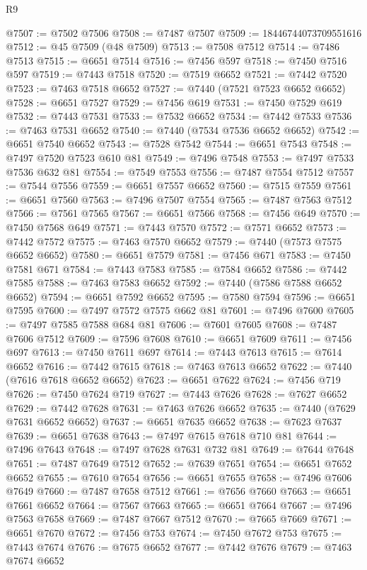 \begin{lexlean}{R9}
\begin{coremodule}
{{{{{{{{{{{{{{{{{{{{{{{{{{{{{{{{{{{{{{{{{{{{{{{{{{{{{{{{{{{{{{{{{{{{{{{{{{{{{{{{{{{{@7507 := @7502 @7506
@7508 := @7487 @7507
@7509 := 18446744073709551616
@7512 := @45 @7509 (@48 @7509)
@7513 := @7508 @7512
@7514 := @7486 @7513
@7515 := @6651 @7514
@7516 := @7456 @597
@7518 := @7450 @7516 @597
@7519 := @7443 @7518
@7520 := @7519 @6652
@7521 := @7442 @7520
@7523 := @7463 @7518 @6652
@7527 := @7440 (@7521 @7523 @6652 @6652)
@7528 := @6651 @7527
@7529 := @7456 @619
@7531 := @7450 @7529 @619
@7532 := @7443 @7531
@7533 := @7532 @6652
@7534 := @7442 @7533
@7536 := @7463 @7531 @6652
@7540 := @7440 (@7534 @7536 @6652 @6652)
@7542 := @6651 @7540 @6652
@7543 := @7528 @7542
@7544 := @6651 @7543
@7548 := @7497 @7520 @7523 @610 @81
@7549 := @7496 @7548
@7553 := @7497 @7533 @7536 @632 @81
@7554 := @7549 @7553
@7556 := @7487 @7554 @7512
@7557 := @7544 @7556
@7559 := @6651 @7557 @6652
@7560 := @7515 @7559
@7561 := @6651 @7560
@7563 := @7496 @7507 @7554
@7565 := @7487 @7563 @7512
@7566 := @7561 @7565
@7567 := @6651 @7566
@7568 := @7456 @649
@7570 := @7450 @7568 @649
@7571 := @7443 @7570
@7572 := @7571 @6652
@7573 := @7442 @7572
@7575 := @7463 @7570 @6652
@7579 := @7440 (@7573 @7575 @6652 @6652)
@7580 := @6651 @7579
@7581 := @7456 @671
@7583 := @7450 @7581 @671
@7584 := @7443 @7583
@7585 := @7584 @6652
@7586 := @7442 @7585
@7588 := @7463 @7583 @6652
@7592 := @7440 (@7586 @7588 @6652 @6652)
@7594 := @6651 @7592 @6652
@7595 := @7580 @7594
@7596 := @6651 @7595
@7600 := @7497 @7572 @7575 @662 @81
@7601 := @7496 @7600
@7605 := @7497 @7585 @7588 @684 @81
@7606 := @7601 @7605
@7608 := @7487 @7606 @7512
@7609 := @7596 @7608
@7610 := @6651 @7609
@7611 := @7456 @697
@7613 := @7450 @7611 @697
@7614 := @7443 @7613
@7615 := @7614 @6652
@7616 := @7442 @7615
@7618 := @7463 @7613 @6652
@7622 := @7440 (@7616 @7618 @6652 @6652)
@7623 := @6651 @7622
@7624 := @7456 @719
@7626 := @7450 @7624 @719
@7627 := @7443 @7626
@7628 := @7627 @6652
@7629 := @7442 @7628
@7631 := @7463 @7626 @6652
@7635 := @7440 (@7629 @7631 @6652 @6652)
@7637 := @6651 @7635 @6652
@7638 := @7623 @7637
@7639 := @6651 @7638
@7643 := @7497 @7615 @7618 @710 @81
@7644 := @7496 @7643
@7648 := @7497 @7628 @7631 @732 @81
@7649 := @7644 @7648
@7651 := @7487 @7649 @7512
@7652 := @7639 @7651
@7654 := @6651 @7652 @6652
@7655 := @7610 @7654
@7656 := @6651 @7655
@7658 := @7496 @7606 @7649
@7660 := @7487 @7658 @7512
@7661 := @7656 @7660
@7663 := @6651 @7661 @6652
@7664 := @7567 @7663
@7665 := @6651 @7664
@7667 := @7496 @7563 @7658
@7669 := @7487 @7667 @7512
@7670 := @7665 @7669
@7671 := @6651 @7670
@7672 := @7456 @753
@7674 := @7450 @7672 @753
@7675 := @7443 @7674
@7676 := @7675 @6652
@7677 := @7442 @7676
@7679 := @7463 @7674 @6652
}}}}}}}}}}}}}}}}}}}}}}}}}}}}}}}}}}}}}}}}}}}}}}}}}}}}}}}}}}}}}}}}}}}}}}}}}}}}}}}}}}}}
\end{coremodule}
\end{lexlean}
